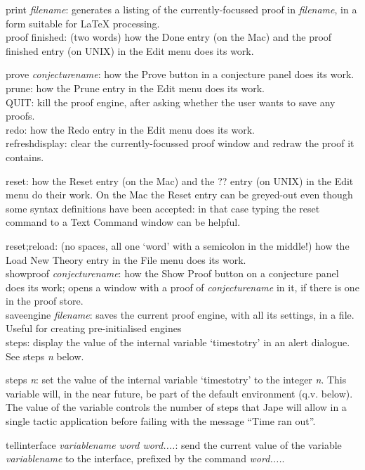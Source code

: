 print \textit{filename}: generates a listing of the currently-focussed proof in \textit{filename}, in a form suitable for LaTeX processing.\\
proof finished: (two words) how the Done entry (on the Mac) and the proof finished entry (on UNIX) in the Edit menu does its work.


prove \textit{conjecturename}: how the Prove button in a conjecture panel does its work.\\
prune: how the Prune entry in the Edit menu does its work.\\
QUIT: kill the proof engine, after asking whether the user wants to save any proofs.\\
redo: how the Redo entry in the Edit menu does its work.\\
refreshdisplay: clear the currently-focussed proof window and redraw the proof it contains.


reset: how the Reset entry (on the Mac) and the ?? entry (on UNIX) in the Edit menu do their work. On the Mac the Reset entry can be greyed-out even though some syntax definitions have been accepted: in that case typing the reset command to a Text Command window can be helpful.


reset;reload: (no spaces, all one `word' with a semicolon in the middle!) how the Load New Theory entry in the File menu does its work.\\
showproof \textit{conjecturename}: how the Show Proof button on a conjecture panel does its work; opens a window with a proof of \textit{conjecturename} in it, if there is one in the proof store.\\
saveengine \textit{filename}: saves the current proof engine, with all its settings, in a file. Useful for creating pre-initialised engines\\
steps: display the value of the internal variable `timestotry' in an alert dialogue. See steps \textit{n} below.


steps \textit{n}: set the value of the internal variable `timestotry' to the integer \textit{n}. This variable will, in the near future, be part of the default environment (q.v. below). The value of the variable controls the number of steps that Jape will allow in a single tactic application before failing with the message ``Time ran out''.


tellinterface \textit{variablename word word....}: send the current value of the variable \textit{variablename} to the interface, prefixed by the command \textit{word....}.


